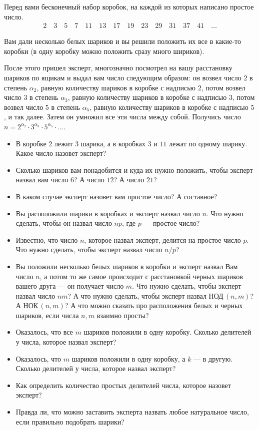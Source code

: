 ﻿

Перед вами бесконечный набор коробок, на каждой из которых написано простое число. 
\begin{align*}
2 \quad 3 \quad 5 \quad 7 \quad 11 \quad 13 \quad 17 \quad 19 \quad 23 \quad 29 \quad 31 \quad 37 \quad 41 \quad \ldots
\end{align*}

Вам дали несколько белых шариков и вы решили положить их все в какие-то коробки (в одну коробку можно положить сразу много шириков). \medskip

После этого пришел эксперт, многозначно посмотрел на вашу расстановку шариков по ящикам и выдал вам число следующим образом: он возвел число $2$ в степень $\alpha_2$, равную количеству шариков в коробке с надписью $2$, потом возвел число $3$ в степень $\alpha_3$, равную количеству шариков в коробке с надписью $3$, потом возвел число $5$ в степень $\alpha_5$, равную количеству шариков в коробке с надписью $5$, и так далее. Затем он умножил все эти числа между собой. Получись число $n = 2^{\alpha_2}\cdot 3^{\alpha_3}\cdot 5^{\alpha_5}\cdot \ldots$.

\begin{itemize}
\item В коробке $2$ лежит $3$ шарика, а в коробках $3$ и $11$ лежат по одному шарику. Какое число назовет эксперт?
\item Сколько шариков вам понадобится и куда их нужно положить, чтобы эксперт назвал вам число $6$? А число $12$? А число $21$?
\item В каком случае эксперт назовет вам простое число? А составное? 
\item Вы расположили шарики в коробках и эксперт назвал число $n$. Что нужно сделать, чтобы он назвал число $np$, где $p$ --- простое число?
\item Известно, что число $n$, которое назвал эксперт, делится на простое число $p$. Что нужно сделать, чтобы эксперт назвал число $n/p$?
\item Вы положили несколько белых шариков в коробки и эксперт назвал Вам число $n$, а потом то же самое происходит с расстановкой черных шариков вашего друга --- он получает число $m$. Что нужно сделать, чтобы эксперт назвал число $nm$? А что нужно сделать, чтобы эксперт назвал НОД\,$(n,m)$? А НОК\,$(n,m)$? А что можно сказать про расположения белых и черных шариков, если числа $n,m$ взаимно просты?
\item Оказалось, что все $m$ шариков положили в одну коробку. Сколько делителей у числа, которое назвал эксперт?
\item Оказалось, что $m$ шариков положили в одну коробку, а $k$ --- в другую. Сколько делителей у числа, которое назвал эксперт?
\item Как определить количество простых делителей числа, которое назовет эксперт?
\item Правда ли, что можно заставить эксперта назвать любое натуральное число, если правильно подобрать шарики?

\end{itemize}